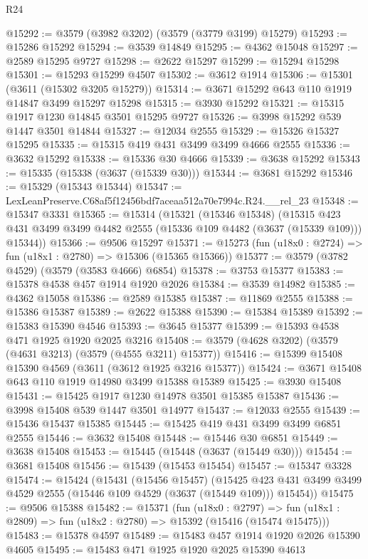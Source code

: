 \begin{lexlean}{R24}
\begin{coremodule}
@15292 := @3579 (@3982 @3202) (@3579 (@3779 @3199) @15279)
@15293 := @15286 @15292
@15294 := @3539 @14849
@15295 := @4362 @15048
@15297 := @2589 @15295 @9727
@15298 := @2622 @15297
@15299 := @15294 @15298
@15301 := @15293 @15299 @4507
@15302 := @3612 @1914
@15306 := @15301 (@3611 (@15302 @3205 @15279))
@15314 := @3671 @15292 @643 @110 @1919 @14847 @3499 @15297 @15298
@15315 := @3930 @15292
@15321 := @15315 @1917 @1230 @14845 @3501 @15295 @9727
@15326 := @3998 @15292 @539 @1447 @3501 @14844
@15327 := @12034 @2555
@15329 := @15326 @15327 @15295
@15335 := @15315 @419 @431 @3499 @3499 @4666 @2555
@15336 := @3632 @15292
@15338 := @15336 @30 @4666
@15339 := @3638 @15292
@15343 := @15335 (@15338 (@3637 (@15339 @30)))
@15344 := @3681 @15292
@15346 := @15329 (@15343 @15344)
@15347 := LexLeanPreserve.C68af5f12456bdf7aceaa512a70e7994c.R24.__rel_23
@15348 := @15347 @3331
@15365 := @15314
    (@15321
      (@15346 @15348)
      (@15315 @423 @431 @3499 @3499 @4482 @2555 (@15336 @109 @4482 (@3637 (@15339 @109))) @15344))
@15366 := @9506 @15297
@15371 := @15273 (fun (u18x0 : @2724) => fun (u18x1 : @2780) => @15306 (@15365 @15366))
@15377 := @3579 (@3782 @4529) (@3579 (@3583 @4666) @6854)
@15378 := @3753 @15377
@15383 := @15378 @4538 @457 @1914 @1920 @2026
@15384 := @3539 @14982
@15385 := @4362 @15058
@15386 := @2589 @15385
@15387 := @11869 @2555
@15388 := @15386 @15387
@15389 := @2622 @15388
@15390 := @15384 @15389
@15392 := @15383 @15390 @4546
@15393 := @3645 @15377
@15399 := @15393 @4538 @471 @1925 @1920 @2025 @3216
@15408 := @3579 (@4628 @3202) (@3579 (@4631 @3213) (@3579 (@4555 @3211) @15377))
@15416 := @15399 @15408 @15390 @4569 (@3611 (@3612 @1925 @3216 @15377))
@15424 := @3671 @15408 @643 @110 @1919 @14980 @3499 @15388 @15389
@15425 := @3930 @15408
@15431 := @15425 @1917 @1230 @14978 @3501 @15385 @15387
@15436 := @3998 @15408 @539 @1447 @3501 @14977
@15437 := @12033 @2555
@15439 := @15436 @15437 @15385
@15445 := @15425 @419 @431 @3499 @3499 @6851 @2555
@15446 := @3632 @15408
@15448 := @15446 @30 @6851
@15449 := @3638 @15408
@15453 := @15445 (@15448 (@3637 (@15449 @30)))
@15454 := @3681 @15408
@15456 := @15439 (@15453 @15454)
@15457 := @15347 @3328
@15474 := @15424
    (@15431
      (@15456 @15457)
      (@15425 @423 @431 @3499 @3499 @4529 @2555 (@15446 @109 @4529 (@3637 (@15449 @109))) @15454))
@15475 := @9506 @15388
@15482 := @15371
    (fun (u18x0 : @2797) =>
    fun (u18x1 : @2809) => fun (u18x2 : @2780) => @15392 (@15416 (@15474 @15475)))
@15483 := @15378 @4597
@15489 := @15483 @457 @1914 @1920 @2026 @15390 @4605
@15495 := @15483 @471 @1925 @1920 @2025 @15390 @4613

\end{coremodule}
\end{lexlean}
